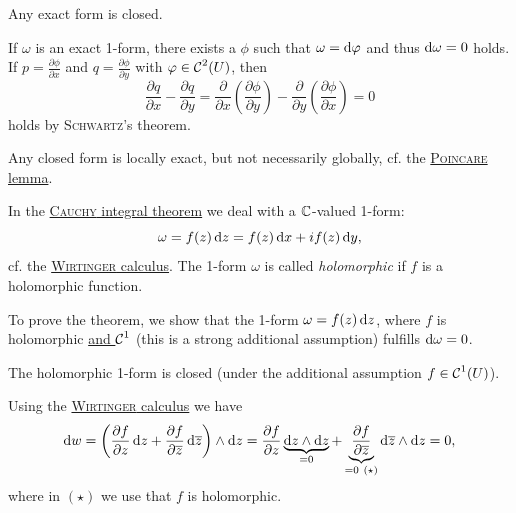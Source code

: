 \documentclass[a4paper,english]{article}
\begin{document}
\begin{cor}
    Any exact form is closed.    
\end{cor}

\begin{pr}
    If $\omega$ is an exact 1-form, there exists a $\phi$ such that $\omega = \mathop{}\!\mathrm{d}{\varphi}$ and thus $\mathop{}\!\mathrm{d}\omega = 0$ holds.
    If $p = \frac{\partial \phi}{\partial x}$ and $q = \frac{\partial \phi}{\partial y}$ with $\varphi \in \operatorname{\mathcal{C}}^2(U)$, then
    \begin{equation*}
        \frac{\partial q}{\partial x} - \frac{\partial q}{\partial y}
        = \frac{\partial}{\partial x} \left( \frac{\partial \phi}{\partial y}\right)
        - \frac{\partial}{\partial y} \left( \frac{\partial \phi}{\partial x}\right)
        = 0
    \end{equation*}
    holds by \textsc{Schwartz}'s theorem. 
\end{pr}

Any closed form is locally exact, but not necessarily globally, cf. the \hyperref[th:Poincare]{\textsc{Poincare} lemma}.


In the \hyperref[th:Cauchy]{\textsc{Cauchy} integral theorem} we deal with a $\operatorname{\mathbb{C}}$-valued 1-form:
\begin{equation*}
    \omega
    = f(z) \mathop{}\!\mathrm{d}{z}
    = f(z) \mathop{}\!\mathrm{d}{x} + i f(z) \mathop{}\!\mathrm{d}{y},
\end{equation*}
cf. the \hyperref[subsubsection:Wirtinger]{\textsc{Wirtinger} calculus}.
The 1-form $\omega$ is called \emph{holomorphic} if $f$ is a holomorphic function.

To prove the theorem, we show that the 1-form $\omega = f(z) \mathop{}\!\mathrm{d}{z}$, where $f$ is holomorphic \underline{and $\operatorname{\mathcal{C}}^1$} (this is a strong additional assumption) fulfills $\mathop{}\!\mathrm{d}{\omega} = 0$.

The holomorphic 1-form is closed (under the additional assumption $f \in \operatorname{\mathcal{C}}^1(U)$).

\begin{pr}
    Using the \hyperref[subsubsection:Wirtinger]{\textsc{Wirtinger} calculus} we have
    \begin{equation*}
        \diff{w}
        = \left( \frac{\partial f}{\partial z} \diff{z} + \frac{\partial f}{\partial \overline{z}} \diff{\overline{z}}\right) \wedge \diff{z}
        = \frac{\partial f}{\partial z} \underbrace{\diff{z} \wedge \diff{z}}_{=0} + \underbrace{\frac{\partial f}{\partial \overline{z}}}_{=0 \ (\star)} \diff{\overline{z}} \wedge \diff{z}
        = 0,
    \end{equation*}
    where in $(\star)$ we use that $f$ is holomorphic.
\end{pr}
\end{document}
